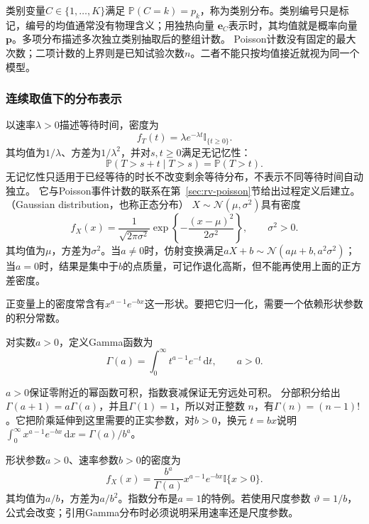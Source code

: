 类别变量\(C\in\{1,\ldots,K\}\)满足
\(\mathbb P(C=k)=p_k\)，称为类别分布。类别编号只是标记，编号的均值通常没有物理含义；用独热向量
\(\bm e_C\)表示时，其均值就是概率向量\(\bm p\)。多项分布描述多次独立类别抽取后的整组计数。
Poisson计数没有固定的最大次数；二项计数的上界则是已知试验次数\(n\)。二者不能只按均值接近就视为同一个模型。

\subsubsection{连续取值下的分布表示}
以速率\(\lambda>0\)描述等待时间，密度为
\[
f_T(t)=\lambda e^{-\lambda t}\mathbb I_{\{t\geq0\}}.
\]
其均值为\(1/\lambda\)、方差为\(1/\lambda^2\)，并对\(s,t\geq0\)满足无记忆性：
\[ \mathbb{P}(T>s+t\mid T>s)=\mathbb{P}(T>t). \]
无记忆性只适用于已经等待的时长不改变剩余等待分布，不表示不同等待时间自动独立。
它与Poisson事件计数的联系在第~\ref{sec:rv-poisson}节给出过程定义后建立。
（Gaussian distribution，也称正态分布）
\(X\sim\mathcal{N}(\mu,\sigma^2)\)具有密度
\[ f_X(x)
  =\frac{1}{\sqrt{2\pi\sigma^2}}\exp\left\{-\frac{(x-\mu)^2}{2\sigma^2}\right\},\qquad \sigma^2>0. \]
其均值为\(\mu\)，方差为\(\sigma^2\)。当\(a\neq0\)时，仿射变换满足\(aX+b\sim\mathcal{N}(a\mu+b,a^2\sigma^2)\)；当\(a=0\)时，结果是集中于\(b\)的点质量，可记作退化高斯，但不能再使用上面的正方差密度。

正变量上的密度常含有\(x^{a-1}e^{-bx}\)这一形状。要把它归一化，需要一个依赖形状参数的积分常数。
\begin{definition}[Gamma函数]
  \label{def:probability-gamma-function}
对实数\(a>0\)，定义Gamma函数为
\begin{equation}
  \Gamma(a)=\int_0^\infty t^{a-1}e^{-t}\,\mathrm dt,
  \qquad a>0.
  \label{eq:probability-gamma-function}
\end{equation}
\end{definition}
\(a>0\)保证零附近的幂函数可积，指数衰减保证无穷远处可积。
分部积分给出\(\Gamma(a+1)=a\Gamma(a)\)，并且\(\Gamma(1)=1\)，所以对正整数
\(n\)，有\(\Gamma(n)=(n-1)!\)。它把阶乘延伸到这里需要的正实参数，对\(b>0\)，换元
\(t=bx\)说明\(\int_0^\infty x^{a-1}e^{-bx}\,\mathrm dx=\Gamma(a)/b^a\)。

形状参数\(a>0\)、速率参数\(b>0\)的密度为
\[ f_X(x)
  =\frac{b^a}{\Gamma(a)}x^{a-1}e^{-bx}\mathbb{I}\{x>0\}. \]
其均值为\(a/b\)，方差为\(a/b^2\)。指数分布是\(a=1\)的特例。若使用尺度参数
\(\vartheta=1/b\)，公式会改变；引用Gamma分布时必须说明采用速率还是尺度参数。

